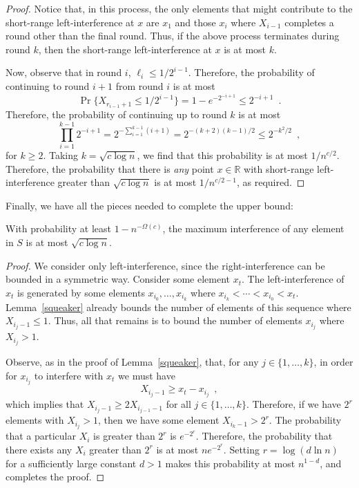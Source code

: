 \documentclass{patmorin}
\begin{document}
\begin{proof}
Notice that, in this process, the only elements that might contribute
to the short-range left-interference at $x$ are $x_1$ and those $x_i$
where $X_{i-1}$ completes a round other than the final round.  Thus,
if the above process terminates during round $k$, then the short-range
left-interference at $x$ is at most $k$.

Now, observe that in round $i$, $\ell_i \le 1/2^{i-1}$.  Therefore,
the probability of continuing to round $i+1$ from round $i$ is at most
\[
   \Pr\{X_{r_{i-1}+1} \le 1/2^{i-1}\} = 1-e^{-2^{-i+1}} \le 2^{-i+1} \enspace .
\]
Therefore, the probability of continuing up to round $k$ is at most
\[
  \prod_{i=1}^{k-1} 2^{-i+1}
  = 2^{-\sum_{i=1}^{k-1}(i+1)}
  = 2^{-(k+2)(k-1)/2} \le 2^{-k^2/2} \enspace ,
\]
for $k\ge 2$.  Taking $k=\sqrt{c\log n}$, we find that this probability
is at most $1/n^{c/2}$.  Therefore, the probability that there
is \emph{any} point $x \in \mathbb{R}$ with short-range left-interference greater
than $\sqrt{c\log n}$ is at most $1/n^{c/2-1}$, as required.
\end{proof}


Finally, we have all the pieces needed to complete the upper bound:

\begin{lem}\label{upper-bound}
With probability at least $1-n^{-\Omega(c)}$, the maximum interference of
any element in $S$ is at most $\sqrt{c\log n}$.
\end{lem}

\begin{proof}
We consider only left-interference, since the right-interference
can be bounded in a symmetric way.  Consider some element $x_t$.  The
left-interference of $x_t$ is generated by some elements
$x_{i_0},\ldots,x_{i_k}$ where $x_{i_k}<\cdots<
x_{i_0}<x_t$. Lemma~\ref{squeaker} already bounds the number of elements of this
sequence where $X_{i_j-1} \le 1$.  Thus, all that remains is to bound
the number of elements $x_{i_j}$ where $X_{i_j} > 1$.

Observe, as in the proof of Lemma~\ref{squeaker}, that, for any
$j\in\{1,\ldots,k\}$, in order for $x_{i_j}$ to interfere with $x_t$
we must have
\[
   X_{i_j-1} \ge x_t - x_{i_j}
\enspace ,
\]
which implies that $X_{i_j-1} \ge 2 X_{i_{j-1}-1}$ for all
$j\in\{1,\ldots,k\}$.  Therefore, if we have $2^r$ elements with
$X_{i_j}>1$, then we have some element $X_{i_k-1} > 2^r$.  The probability
that a particular $X_i$ is greater than $2^r$ is $e^{-2^r}$. Therefore,
the probability that there exists any $X_i$ greater than $2^r$ is at most
$ne^{-2^r}$.  Setting $r=\log ( d \ln n )$ for a sufficiently large constant
$d>1$ makes this probability at most $n^{1-d}$, and completes the proof.
\end{proof}
\end{document}
